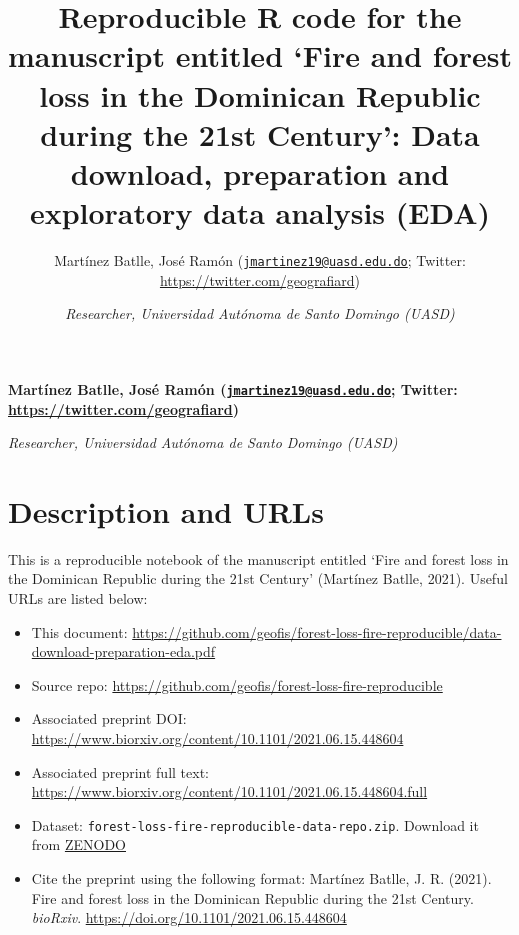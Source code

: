 \documentclass[10pt,landscape,a3paper]{article}
\title{Reproducible R code for the manuscript entitled `Fire and forest
loss in the Dominican Republic during the 21st Century': Data download,
preparation and exploratory data analysis (EDA)  }
\author{\Large Martínez Batlle, José Ramón
(\href{mailto:jmartinez19@uasd.edu.do}{\nolinkurl{jmartinez19@uasd.edu.do}};
Twitter:
\url{https://twitter.com/geografiard})\vspace{0.05in} \newline\normalsize\emph{}   \and \Large \vspace{0.05in} \newline\normalsize\emph{Researcher,
Universidad Autónoma de Santo Domingo (UASD)}  }
\date{}
\newcommand*{\authorfont}{\fontfamily{phv}\selectfont}
\begin{document}
	
%    


{%
\setlength{\parindent}{0pt}
\thispagestyle{plain}
{\fontsize{18}{20}\selectfont\raggedright 
\maketitle  %

}

{
   \vskip 13.5pt\relax \normalsize\fontsize{11}{12} 
\textbf{\authorfont Martínez Batlle, José Ramón
(\href{mailto:jmartinez19@uasd.edu.do}{\nolinkurl{jmartinez19@uasd.edu.do}};
Twitter:
\url{https://twitter.com/geografiard})} \hskip 15pt \emph{\small }   \par \textbf{\authorfont } \hskip 15pt \emph{\small Researcher,
Universidad Autónoma de Santo Domingo (UASD)}   

}

}






\vskip 6.5pt

{
\hypersetup{linkcolor=black}
\setcounter{tocdepth}{4}
\tableofcontents
}

\noindent  \hypertarget{description-and-urls}{%
\section{Description and URLs}\label{description-and-urls}}

This is a reproducible notebook of the manuscript entitled `Fire and
forest loss in the Dominican Republic during the 21st Century' (Martínez
Batlle, 2021). Useful URLs are listed below:

\begin{itemize}
\item
  This document:
  \url{https://github.com/geofis/forest-loss-fire-reproducible/data-download-preparation-eda.pdf}
\item
  Source repo:
  \url{https://github.com/geofis/forest-loss-fire-reproducible}
\item
  Associated preprint DOI:
  \url{https://www.biorxiv.org/content/10.1101/2021.06.15.448604}
\item
  Associated preprint full text:
  \url{https://www.biorxiv.org/content/10.1101/2021.06.15.448604.full}
\item
  Dataset: \texttt{forest-loss-fire-reproducible-data-repo.zip}.
  Download it from \href{https://zenodo.org/record/5681481}{ZENODO}
\item
  Cite the preprint using the following format: Martínez Batlle, J. R.
  (2021). Fire and forest loss in the Dominican Republic during the 21st
  Century. \emph{bioRxiv}.
  \url{https://doi.org/10.1101/2021.06.15.448604}
\end{itemize}
\end{document}

